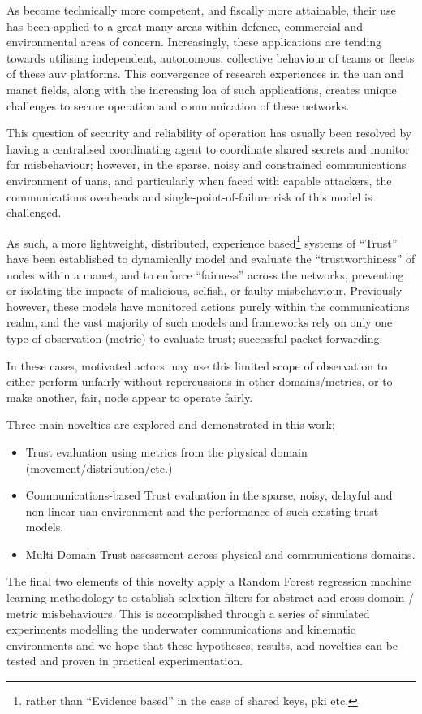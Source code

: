 As  become technically more competent, and fiscally more attainable, their use has been applied to a great many areas within defence, commercial and environmental areas of concern. 
Increasingly, these applications are tending towards utilising independent, autonomous, collective behaviour of teams or fleets of these \gls{auv} platforms.
This convergence of research experiences in the \gls{uan} and \gls{manet} fields, along with the increasing \gls{loa} of such applications, creates unique challenges to secure operation and communication of these networks.

This question of security and reliability of operation has usually been resolved by having a centralised coordinating agent to coordinate shared secrets and monitor for misbehaviour; however, in the sparse, noisy and constrained communications environment of \glspl{uan}, and particularly when faced with capable attackers, the communications overheads and single-point-of-failure risk of this model is challenged.

As such, a more lightweight, distributed, experience based\footnote{rather than ``Evidence based'' in the case of shared keys, \gls{pki} etc.} systems of ``Trust'' have been established to dynamically model and evaluate the ``trustworthiness'' of nodes within a \gls{manet}, and to enforce ``fairness'' across the networks, preventing or isolating the impacts of malicious, selfish, or faulty misbehaviour. 
Previously however, these models have monitored actions purely within the communications realm, and the vast majority of such models and frameworks rely on only one type of observation (metric) to evaluate trust; successful packet forwarding.

In these cases, motivated actors may use this limited scope of observation to either perform unfairly without repercussions in other domains/metrics, or to make another, fair, node appear to operate fairly.

Three main novelties are explored and demonstrated in this work;

\begin{itemize}
	\item Trust evaluation using metrics from the physical domain (movement/distribution/etc.)
	\item Communications-based Trust evaluation in the sparse, noisy, delayful and non-linear \gls{uan} environment and the performance of such existing trust models.
	\item Multi-Domain Trust assessment across physical and communications domains.
\end{itemize}

The final two elements of this novelty apply a Random Forest regression machine learning methodology to establish selection filters for abstract and cross-domain / metric misbehaviours.
This is accomplished through a series of simulated experiments modelling the underwater communications and kinematic environments and we hope that these hypotheses, results, and novelties can be tested and proven in practical experimentation.


